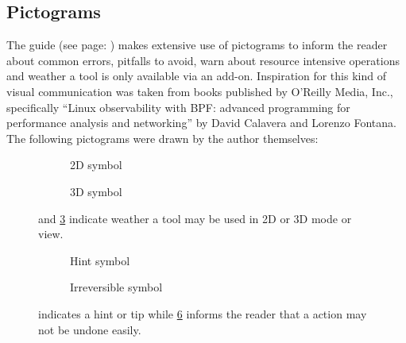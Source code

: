 \subsection{Pictograms}
The guide (see page: \pageref{a:guide}) makes extensive use of pictograms to inform the reader about common errors, pitfalls to avoid, warn about resource intensive operations and weather a tool is only available via an add-on.
Inspiration for this kind of visual communication was taken from books published by O'Reilly Media, Inc., specifically ``Linux observability with BPF: advanced programming for performance analysis and networking'' by David Calavera and Lorenzo Fontana\cite{calaveraLinuxObservabilityBPF2019}.\\
The following pictograms were drawn by the author themselves:
\newline
\begin{figure}[h!]
	\begin{centering}
		\begin{subfigure}{0.5\textwidth}
			
			\caption{2D symbol}
			\label{fig:2d_icon}
		\end{subfigure}
		\begin{subfigure}{0.5\textwidth}
			
			\caption{3D symbol}
			\label{fig:3d_icon}
		\end{subfigure}
	  \end{centering}
	  \caption{ and \cref{fig:3d_icon} indicate weather a tool may be used in 2D or 3D mode or view.}
  \end{figure}

\begin{figure}[h!]
	\begin{centering}
		\begin{subfigure}{0.5\textwidth}
			
			\caption{Hint symbol}
			\label{fig:hint_icon}
		\end{subfigure}
		\begin{subfigure}{0.5\textwidth}
			
			\caption{Irreversible symbol}
			\label{fig:noundo_icon}
		\end{subfigure}
	  \end{centering}
	  \caption{ indicates a hint or tip while \cref{fig:noundo_icon} informs the reader that a action may not be undone easily.}
\end{figure}

